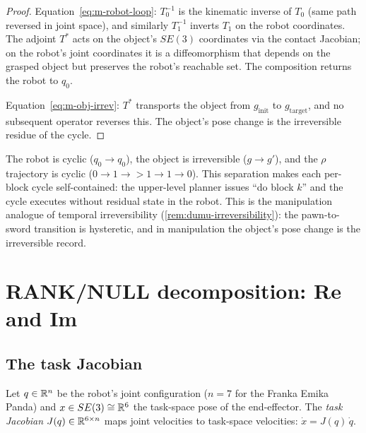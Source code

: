 \begin{proof}
Equation~\eqref{eq:m-robot-loop}: $T_0^{-1}$ is the kinematic
inverse of $T_0$ (same path reversed in joint space), and
similarly $T_1^{-1}$ inverts $T_1$ on the robot coordinates.
The adjoint $T^*$ acts on the object's $SE(3)$ coordinates via
the contact Jacobian; on the robot's joint coordinates it is a
diffeomorphism that depends on the grasped object but preserves
the robot's reachable set.  The composition returns the robot to
$q_0$.

Equation~\eqref{eq:m-obj-irrev}: $T^*$ transports the object from
$g_\mathrm{init}$ to $g_\mathrm{target}$, and no subsequent
operator reverses this.  The object's pose change is the
irreversible residue of the cycle.
\end{proof}

\begin{remark}\label{rem:m-separation}
The robot is cyclic ($q_0 \to q_0$), the object is irreversible
($g \to g'$), and the $\rho$ trajectory is cyclic
($0 \to 1 \to {>}1 \to 1 \to 0$).  This separation makes each
per-block cycle self-contained: the upper-level planner issues
``do block $k$'' and the cycle executes without residual state
in the robot.  This is the manipulation analogue of temporal
irreversibility (\cref{rem:dumu-irreversibility}): the
pawn-to-sword transition is hysteretic, and in manipulation the
object's pose change is the irreversible record.
\end{remark}


\section{RANK/NULL decomposition: Re and Im}
\label{sec:m-ranknull}

\subsection{The task Jacobian}

Let $q \in \mathbb{R}^n$ be the robot's joint configuration ($n = 7$ for
the Franka Emika Panda) and $x \in SE(3) \cong \mathbb{R}^6$ the task-space
pose of the end-effector.  The \emph{task Jacobian}
$J(q) \in \mathbb{R}^{6 \times n}$ maps joint velocities to task-space
velocities: $\dot{x} = J(q)\,\dot{q}$.

